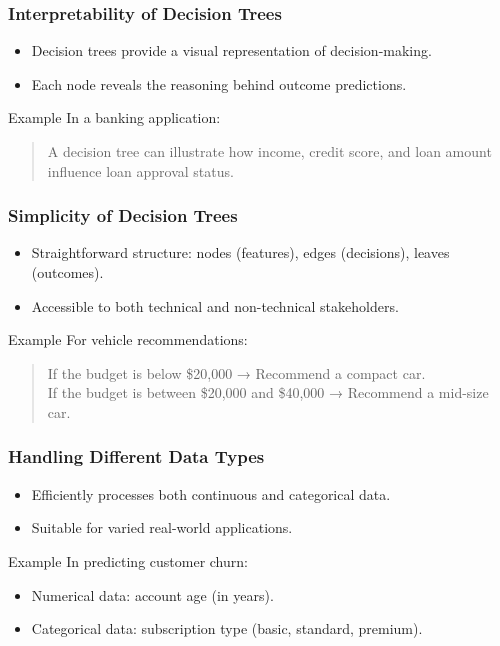 \documentclass{beamer}
\begin{document}
\begin{frame}[fragile]
    \frametitle{Interpretability of Decision Trees}
    \begin{itemize}
        \item Decision trees provide a visual representation of decision-making.
        \item Each node reveals the reasoning behind outcome predictions.
    \end{itemize}
    \begin{block}{Example}
        In a banking application:
        \begin{quote}
            A decision tree can illustrate how income, credit score, and loan amount influence loan approval status.
        \end{quote}
    \end{block}
\end{frame}

\begin{frame}[fragile]
    \frametitle{Simplicity of Decision Trees}
    \begin{itemize}
        \item Straightforward structure: nodes (features), edges (decisions), leaves (outcomes).
        \item Accessible to both technical and non-technical stakeholders.
    \end{itemize}
    \begin{block}{Example}
        For vehicle recommendations:
        \begin{quote}
            If the budget is below \$20,000 → Recommend a compact car.\\
            If the budget is between \$20,000 and \$40,000 → Recommend a mid-size car.
        \end{quote}
    \end{block}
\end{frame}

\begin{frame}[fragile]
    \frametitle{Handling Different Data Types}
    \begin{itemize}
        \item Efficiently processes both continuous and categorical data.
        \item Suitable for varied real-world applications.
    \end{itemize}
    \begin{block}{Example}
        In predicting customer churn:
        \begin{itemize}
            \item Numerical data: account age (in years).
            \item Categorical data: subscription type (basic, standard, premium).
        \end{itemize}
    \end{block}
\end{frame}
\end{document}
